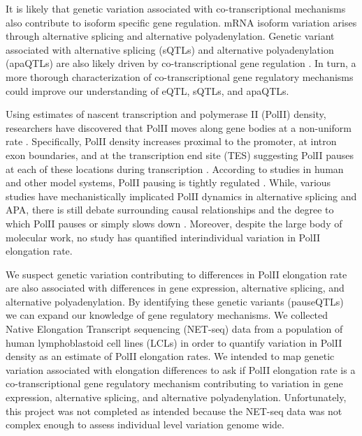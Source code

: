 It is likely that genetic variation associated with co-transcriptional mechanisms also contribute to isoform specific gene regulation. mRNA isoform variation arises through alternative splicing and alternative polyadenylation. Genetic variant associated with alternative splicing (sQTLs) and alternative polyadenylation (apaQTLs) are also likely driven by co-transcriptional gene regulation \citep{li_rna_2016, mittleman_alternative_2020}. In turn, a more thorough characterization of co-transcriptional gene regulatory mechanisms could improve our understanding of eQTL, sQTLs, and apaQTLs. 


Using estimates of nascent transcription and polymerase II (PolII) density, researchers have discovered that PolII moves along gene bodies at a non-uniform rate \citep{mayer_native_2015,nojima_mammalian_2015, mahat_base-pair-resolution_2016, day_comprehensive_2016, jonkers_genome-wide_2014}. Specifically, PolII density increases proximal to the promoter, at intron exon boundaries, and at the transcription end site (TES) suggesting PolII pauses at each of these locations during transcription \citep{adelman_promoter-proximal_2012, zeitlinger_rna_2007,rahl_c-myc_2010}.  According to studies in human and other model systems, PolII pausing is tightly regulated \citep{nojima_mammalian_2015, carrillo_oesterreich_global_2010, proudfoot_transcriptional_2016,gromak_pause_2006}. While, various studies have mechanistically implicated PolII dynamics in alternative splicing and APA, there is still debate surrounding causal relationships and the degree to which PolII pauses or simply slows down \citep{price_transient_2018,reimer_rapid_2020}. Moreover, despite the large body of molecular work, no study has quantified interindividual variation in PolII elongation rate. 

We suspect genetic variation contributing to differences in PolII elongation rate are also associated with differences in gene expression, alternative splicing, and alternative polyadenylation. By identifying these genetic variants (pauseQTLs) we can expand our knowledge of gene regulatory mechanisms. We collected Native Elongation Transcript sequencing (NET-seq) data from a population of human lymphoblastoid cell lines (LCLs) in order to quantify variation in PolII density as an estimate of PolII elongation rates. We intended to map genetic variation associated with elongation differences to ask if PolII elongation rate is a co-transcriptional gene regulatory mechanism contributing to variation in gene expression, alternative splicing, and alternative polyadenylation. Unfortunately, this project was not completed as intended because the NET-seq data was not complex enough to assess individual level variation genome wide. 


